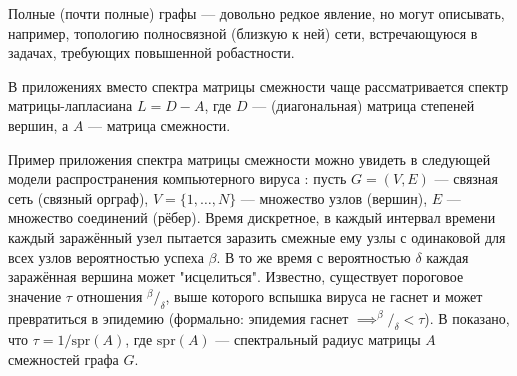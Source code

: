 Полные (почти полные) графы --- довольно редкое явление,
но могут описывать, например, топологию полносвязной (близкую к ней) сети,
встречающуюся в задачах, требующих повышенной робастности.

В приложениях вместо спектра матрицы смежности чаще рассматривается
спектр матрицы-лапласиана \( L = D - A \),
где \( D \) --- (диагональная) матрица степеней вершин,
а \( A \) --- матрица смежности.

Пример приложения спектра матрицы смежности можно увидеть
в следующей модели распространения компьютерного вируса \cite{epidemic-eigenvalues}:
пусть \( G = (V, E) \) --- связная сеть (связный орграф),
\( V = \{1, \ldots, N\} \) --- множество узлов (вершин),
\( E \) --- множество соединений (рёбер).
Время дискретное, в каждый интервал времени каждый заражённый узел
пытается заразить смежные ему узлы с одинаковой для всех узлов вероятностью успеха \( \beta \).
В то же время с вероятностью \( \delta \) каждая заражённая вершина может "исцелиться".
Известно, существует пороговое значение \( \tau \) отношения \( {^\beta}/_{\delta} \),
выше которого вспышка вируса не гаснет и может превратиться в эпидемию
(формально: эпидемия гаснет \( \implies ^{\beta}/_{\delta} < \tau \)).
В \cite{epidemic-eigenvalues} показано, что \( \tau = 1/\mathrm{spr}\left({A}\right) \),
где \( \mathrm{spr}\left({A}\right) \) --- спектральный радиус матрицы \( A \) смежностей графа \( G \).
